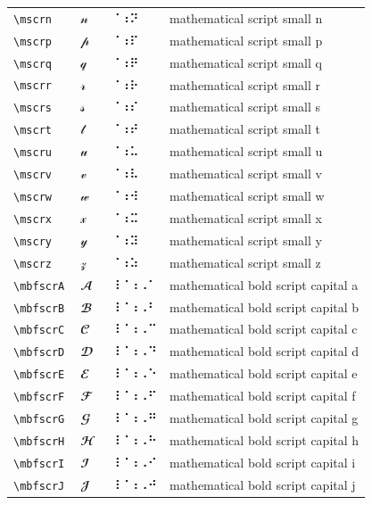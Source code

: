 \documentclass[oneside]{article}
\begin{document}
\begin{longtable}{llll}
\verb|\mscrn| & $\mscrn$ &  ⠈⠰⠝  & {mathematical script small n} \\[2ex]
\verb|\mscrp| & $\mscrp$ &  ⠈⠰⠏  & {mathematical script small p} \\[2ex]
\verb|\mscrq| & $\mscrq$ &  ⠈⠰⠟  & {mathematical script small q} \\[2ex]
\verb|\mscrr| & $\mscrr$ &  ⠈⠰⠗  & {mathematical script small r} \\[2ex]
\verb|\mscrs| & $\mscrs$ &  ⠈⠰⠎  & {mathematical script small s} \\[2ex]
\verb|\mscrt| & $\mscrt$ &  ⠈⠰⠞  & {mathematical script small t} \\[2ex]
\verb|\mscru| & $\mscru$ &  ⠈⠰⠥  & {mathematical script small u} \\[2ex]
\verb|\mscrv| & $\mscrv$ &  ⠈⠰⠧  & {mathematical script small v} \\[2ex]
\verb|\mscrw| & $\mscrw$ &  ⠈⠰⠺  & {mathematical script small w} \\[2ex]
\verb|\mscrx| & $\mscrx$ &  ⠈⠰⠭  & {mathematical script small x} \\[2ex]
\verb|\mscry| & $\mscry$ &  ⠈⠰⠽  & {mathematical script small y} \\[2ex]
\verb|\mscrz| & $\mscrz$ &  ⠈⠰⠵  & {mathematical script small z} \\[2ex]
\verb|\mbfscrA| & $\mbfscrA$ &  ⠸⠈⠰⠠⠁  & {mathematical bold script capital a} \\[2ex]
\verb|\mbfscrB| & $\mbfscrB$ &  ⠸⠈⠰⠠⠃  & {mathematical bold script capital b} \\[2ex]
\verb|\mbfscrC| & $\mbfscrC$ &  ⠸⠈⠰⠠⠉  & {mathematical bold script capital c} \\[2ex]
\verb|\mbfscrD| & $\mbfscrD$ &  ⠸⠈⠰⠠⠙  & {mathematical bold script capital d} \\[2ex]
\verb|\mbfscrE| & $\mbfscrE$ &  ⠸⠈⠰⠠⠑  & {mathematical bold script capital e} \\[2ex]
\verb|\mbfscrF| & $\mbfscrF$ &  ⠸⠈⠰⠠⠋  & {mathematical bold script capital f} \\[2ex]
\verb|\mbfscrG| & $\mbfscrG$ &  ⠸⠈⠰⠠⠛  & {mathematical bold script capital g} \\[2ex]
\verb|\mbfscrH| & $\mbfscrH$ &  ⠸⠈⠰⠠⠓  & {mathematical bold script capital h} \\[2ex]
\verb|\mbfscrI| & $\mbfscrI$ &  ⠸⠈⠰⠠⠊  & {mathematical bold script capital i} \\[2ex]
\verb|\mbfscrJ| & $\mbfscrJ$ &  ⠸⠈⠰⠠⠚  & {mathematical bold script capital j} \\[2ex]

\end{longtable}
\end{document}
